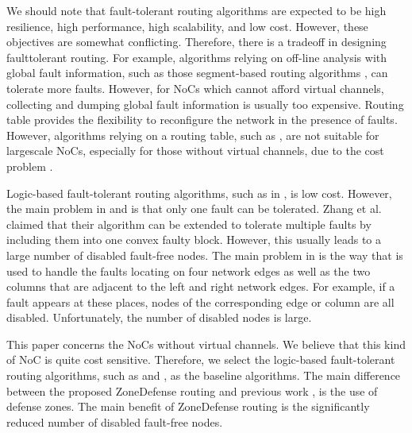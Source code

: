 We should note that fault-tolerant routing algorithms are expected to be high resilience, high performance, high scalability, and low cost. However, these objectives are somewhat conflicting. Therefore, there is a tradeoff in designing faulttolerant routing. For example, algorithms relying on off-line analysis with global fault information, such as those segment-based routing algorithms \cite{fu2011new} \cite{mejia2006segment} \cite{rodrigo2010addressing}, can tolerate more faults. However, for NoCs which cannot afford virtual channels, collecting and dumping global fault information is usually too expensive. Routing table provides the flexibility to reconfigure the network in the presence of faults. However, algorithms relying on a routing table, such as \cite{fick2009highly} \cite{feng2012addressing}, are not suitable for largescale NoCs, especially for those without virtual channels, due to the cost problem \cite{flich2008efficient}.

Logic-based fault-tolerant routing algorithms, such as in \cite{glass1993fault} \cite{wu2003fault} \cite{zhang2008reconfigurable}, is low cost. However, the main problem in  \cite{glass1993fault} and \cite{zhang2008reconfigurable} is that only one fault can be tolerated. Zhang et al. \cite{zhang2008reconfigurable} claimed that their algorithm can be extended to tolerate multiple faults by including them into one convex faulty block. However, this usually leads to a large number of disabled fault-free nodes. The main problem in \cite{wu2003fault} is the way that is used to handle the faults locating on four network edges as well as the two columns that are adjacent to the left and right network edges. For example, if a fault appears at these places, nodes of the corresponding edge or column are all disabled. Unfortunately, the number of disabled nodes is large.

This paper concerns the NoCs without virtual channels. We believe that this kind of NoC is quite cost sensitive. Therefore, we select the logic-based fault-tolerant routing algorithms, such as \cite{wu2003fault} and \cite{zhang2008reconfigurable}, as the baseline algorithms. The main difference between the proposed ZoneDefense routing and previous work \cite{wu2003fault}, \cite{zhang2008reconfigurable} is the use of defense zones. The main benefit of ZoneDefense routing is the significantly reduced number of disabled fault-free nodes.

